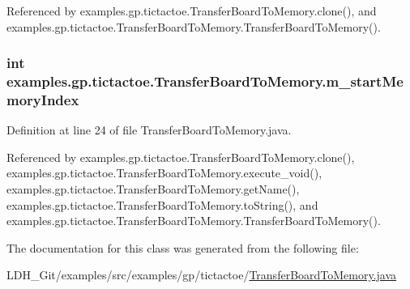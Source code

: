 Referenced by examples.\-gp.\-tictactoe.\-Transfer\-Board\-To\-Memory.\-clone(), and examples.\-gp.\-tictactoe.\-Transfer\-Board\-To\-Memory.\-Transfer\-Board\-To\-Memory().

\hypertarget{classexamples_1_1gp_1_1tictactoe_1_1_transfer_board_to_memory_ace8741f1bb75b7675549c1f8037e96e5}{
\subsubsection[{m\-\_\-start\-Memory\-Index}]{\setlength{\rightskip}{0pt plus 5cm}int examples.\-gp.\-tictactoe.\-Transfer\-Board\-To\-Memory.\-m\-\_\-start\-Memory\-Index\hspace{0.3cm}{\ttfamily [private]}}}\label{classexamples_1_1gp_1_1tictactoe_1_1_transfer_board_to_memory_ace8741f1bb75b7675549c1f8037e96e5}


Definition at line 24 of file Transfer\-Board\-To\-Memory.\-java.



Referenced by examples.\-gp.\-tictactoe.\-Transfer\-Board\-To\-Memory.\-clone(), examples.\-gp.\-tictactoe.\-Transfer\-Board\-To\-Memory.\-execute\-\_\-void(), examples.\-gp.\-tictactoe.\-Transfer\-Board\-To\-Memory.\-get\-Name(), examples.\-gp.\-tictactoe.\-Transfer\-Board\-To\-Memory.\-to\-String(), and examples.\-gp.\-tictactoe.\-Transfer\-Board\-To\-Memory.\-Transfer\-Board\-To\-Memory().



The documentation for this class was generated from the following file\-:\begin{DoxyCompactItemize}
\item 
L\-D\-H\-\_\-\-Git/examples/src/examples/gp/tictactoe/\hyperlink{_transfer_board_to_memory_8java}{Transfer\-Board\-To\-Memory.\-java}\end{DoxyCompactItemize}
